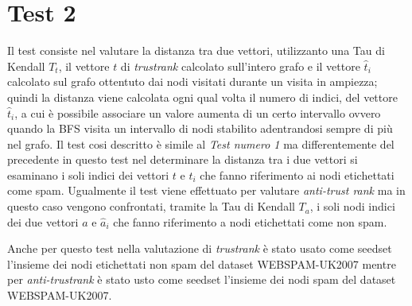 \section{Test 2}
Il test consiste nel valutare la distanza tra due vettori, utilizzanto una Tau di Kendall \(T_t\), il vettore \(t\) di \textit{trustrank} calcolato sull'intero grafo e il vettore \(\hat{t}_i\) calcolato sul grafo ottentuto dai nodi visitati durante un visita in ampiezza; quindi la distanza viene calcolata ogni qual volta il numero di indici, del vettore \(\hat{t}_i\), a cui è possibile associare un valore aumenta  di un certo intervallo ovvero  quando la BFS visita un intervallo di nodi stabilito adentrandosi sempre di più nel grafo. Il test cosi descritto è simile al \textit{Test numero 1} ma differentemente del precedente in questo test nel determinare la distanza tra i due vettori si esaminano i soli indici dei vettori \(t\) e \(\hat{t}_i\) che fanno riferimento ai nodi etichettati come spam. Ugualmente il test viene effettuato per valutare \textit{anti-trust rank} ma in questo caso vengono confrontati, tramite la Tau di Kendall \(T_a\), i soli nodi indici dei due vettori \(a\) e \(\hat{a}_i\) che fanno 
riferimento a nodi etichettati come non spam.

Anche per questo test nella valutazione di \textit{trustrank} è stato usato come seedset l'insieme dei nodi etichettati non spam del dataset WEBSPAM-UK2007 mentre per \textit{anti-trustrank} è stato usto come seedset l'insieme dei nodi spam del dataset WEBSPAM-UK2007.

